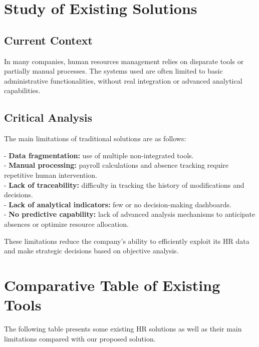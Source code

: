 \section{Study of Existing Solutions}

\subsection{Current Context}

In many companies, human resources management relies on disparate tools or partially manual processes. The systems used are often limited to basic administrative functionalities, without real integration or advanced analytical capabilities.

\subsection{Critical Analysis}

The main limitations of traditional solutions are as follows:

- \textbf{Data fragmentation:} use of multiple non-integrated tools.\\
- \textbf{Manual processing:} payroll calculations and absence tracking require repetitive human intervention.\\
- \textbf{Lack of traceability:} difficulty in tracking the history of modifications and decisions.\\
- \textbf{Lack of analytical indicators:} few or no decision-making dashboards.\\
- \textbf{No predictive capability:} lack of advanced analysis mechanisms to anticipate absences or optimize resource allocation.

These limitations reduce the company’s ability to efficiently exploit its HR data and make strategic decisions based on objective analysis.

\section{Comparative Table of Existing Tools}

The following table presents some existing HR solutions as well as their main limitations compared with our proposed solution.

